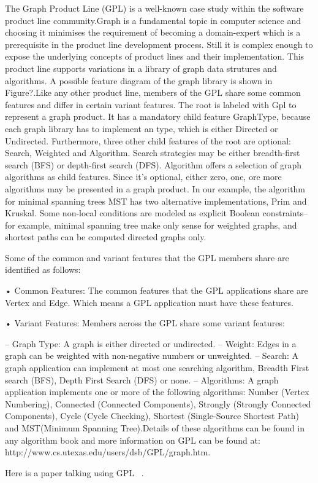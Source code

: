 

The Graph Product Line (GPL) is a well-known case study within the software product line community.Graph is a
fundamental topic in computer science and choosing it minimises the requirement
of becoming a domain-expert which is a prerequisite in the product line development process. Still it is complex
enough to expose the underlying concepts of product lines and their implementation. This product line
 supports variations in a library of graph data strutures and algorithms. A possible feature diagram of the graph
 library is shown in Figure?.Like any other product line, members of the GPL share some common features and differ in
 certain variant features. The root is labeled with Gpl to represent a graph product. It has a mandatory child feature
 GraphType, because each graph library has to implement an type, which is either Directed or Undirected. Furthermore,
 three other child features of the root are optional: Search, Weighted and Algorithm. Search strategies may be either
  breadth-first search (BFS) or depth-first search (DFS). Algorithm offers a selection of graph algorithms as child
  features. Since it's optional, either zero, one, ore more algorithms may be presented in a graph product. In our
  example, the algorithm for minimal spanning trees MST has two alternative implementations, Prim and Kruskal. Some
  non-local conditions are modeled as explicit Boolean constraints-- for example, minimal spanning tree make only
  sense for weighted graphs, and shortest paths can be computed directed graphs only.

  Some of the common and variant features that the GPL members share are identified as
  follows:

  • Common Features: The common features that the GPL applications share are Vertex and Edge.
  Which means a GPL application must have these features.

  • Variant Features: Members across the GPL share some variant features:

  – Graph Type: A graph is either directed or undirected.
  – Weight: Edges in a graph can be weighted with non-negative numbers or unweighted.
  – Search: A graph application can implement at most one searching algorithm, Breadth First
  search (BFS), Depth First Search (DFS) or none.
  – Algorithms: A graph application implements one or more of the following algorithms: Number
  (Vertex Numbering), Connected (Connected Components), Strongly (Strongly Connected
  Components), Cycle (Cycle Checking), Shortest (Single-Source Shortest Path) and MST(Minimum
  Spanning Tree).Details of these algorithms can be found in any algorithm book and more information
  on GPL can be found at: http://www.cs.utexas.edu/users/dsb/GPL/graph.htm.

Here is a paper talking using GPL ~\cite{Thum:2011:AFF:2061045.2062153}.
